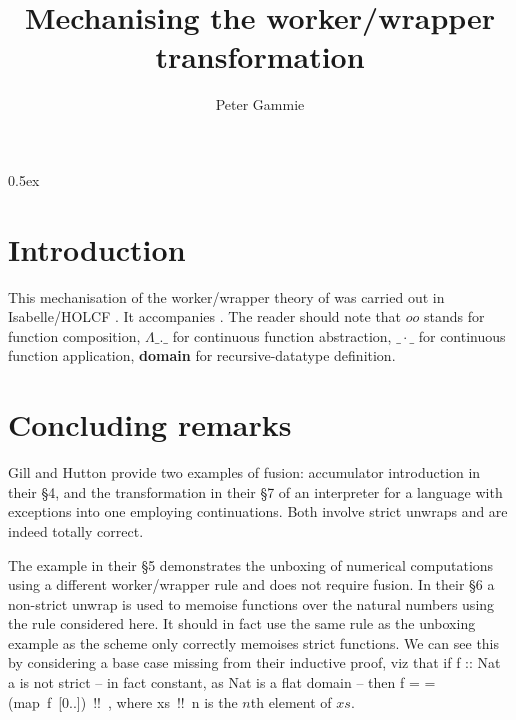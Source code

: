 \documentclass[11pt,a4paper]{article}
\begin{document}
\title{Mechanising the worker/wrapper transformation}
\author{Peter Gammie}
\maketitle

\tableofcontents

\parindent 0pt\parskip 0.5ex

\section{Introduction}

This mechanisation of the worker/wrapper theory of
\citet{GillHutton:2009} was carried out in Isabelle/HOLCF
\citep{HOLCF:1999, DBLP:conf/tphol/Huffman09}.  It accompanies
\citet{Gammie:2011}. The reader should note that $oo$ stands for
function composition, $\Lambda \_ . \_$ for continuous function
abstraction, $\_\cdot\_$ for continuous function application,
\textbf{domain} for recursive-datatype definition.



\section{Concluding remarks}

Gill and Hutton provide two examples of fusion: accumulator
introduction in their \S4, and the transformation in their \S7 of an
interpreter for a language with exceptions into one employing
continuations. Both involve strict \<unwrap\>s and are indeed totally
correct.

The example in their \S5 demonstrates the unboxing of numerical
computations using a different worker/wrapper rule and does not
require fusion. In their \S6 a non-strict \<unwrap\> is used to
memoise functions over the natural numbers using the rule considered
here. It should in fact use the same rule as the unboxing example as
the scheme only correctly memoises strict functions. We can see this
by considering a base case missing from their inductive proof, viz
that if \<f :: Nat \to a\> is not strict -- in fact constant, as
\<Nat\> is a flat domain -- then \<f \bot \not= \bot = (map\ f\
[0..])\ !!\ \bot\>, where \<xs\ !!\ n\> is the $n$th element of $xs$.



\end{document}
